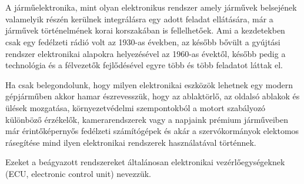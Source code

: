 \chapter{\bevezetes}




A járműelektronika, mint olyan elektronikus rendszer amely járművek belsejének valamelyik részén kerülnek integrálásra egy adott feladat ellátására, már a járművek történelmének korai korszakában is fellelhetőek. Ami a kezdetekben csak egy fedélzeti rádió volt az 1930-as években, az később bővült a gyújtási rendszer elektronikai alapokra helyezésével az 1960-as évektől, később pedig a technológia és a félvezetők fejlődésével egyre több és több feladatot láttak el. 

Ha csak belegondolunk, hogy milyen elektronikai eszközök lehetnek egy modern gépjárműben akkor hamar észrevesszük, hogy az ablaktörlő, az oldalsó ablakok és ülések mozgatása, környezetvédelmi szempontokból a motort szabályozó különböző érzékelők, kamerarendszerek vagy a napjaink prémium járműveiben már érintőképernyős fedélzeti számítógépek és akár a szervókormányok elektomos rásegítése mind ilyen elektronikai rendszerek használatával történnek.

Ezeket a beágyazott rendszereket általánosan elektronikai vezérlőegységeknek (ECU, electronic control unit) nevezzük.\\


